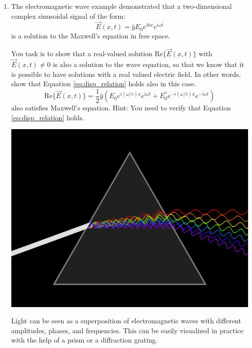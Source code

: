 \begin{enumerate}
\item The electromagnetic wave example demonstrated that a two-dimensional complex sinusoidal signal of the form:
\begin{equation}
    \vec{E}(x,t) = \hat{y}E_0 e^{i k x} e^{i \omega t}
\end{equation}
is a solution to the Maxwell's equation in free space.

You task is to show that a real-valued solution $\mathrm{Re}\{\vec{E}(x,t)\}$ with $\vec{E}(x,t)\ne 0$ is also a solution to the wave equation, so that we know that it is possible to have solutions with a real valued electric field. In other words, show that Equation \ref{eq:disp_relation} holds also in this case.
  \begin{equation}
    \mathrm{Re}\{\vec{E}(x,t)\} = \frac{1}{2}\hat{y}\left(E_0 e^{i (\omega/c) x} e^{i \omega t} + E_0^* e^{-i (\omega/c) x} e^{-i \omega t}\right)
  \end{equation}
  also satisfies Maxwell's equation. Hint: You need to verify that
  Equation \ref{eq:disp_relation} holds.
\fi
  \begin{marginfigure}[0cm]
\begin{center}
  \includegraphics[width=\textwidth]{ch06/figures/prism.png}
\end{center}
\caption{Light can be seen as a superposition of electromagnetic waves with different amplitudes, phases, and frequencies. This can be easily visualized in practice with the help of a prism or a diffraction grating.}
\label{fig:prism_ex}
\end{marginfigure}


\end{enumerate}
